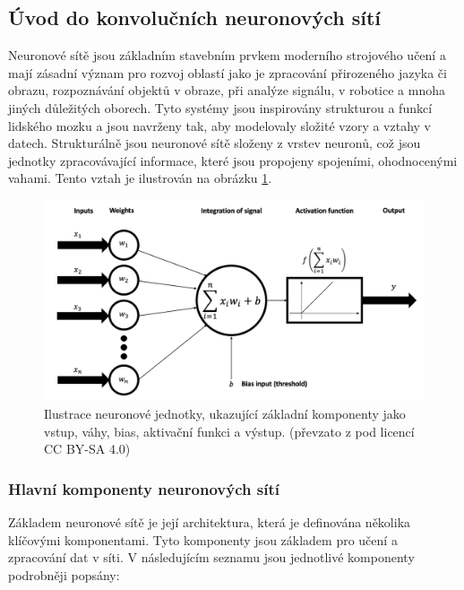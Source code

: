 \documentclass[male,czech,api_ing]{thesis}
\begin{document}
\subsection{Úvod do konvolučních neuronových sítí}
Neuronové sítě jsou základním stavebním prvkem moderního strojového učení a mají zásadní význam pro rozvoj oblastí jako je zpracování přirozeného jazyka či obrazu, rozpoznávání objektů v obraze, při analýze signálu, v robotice a mnoha jiných důležitých oborech. Tyto systémy jsou inspirovány strukturou a funkcí lidského mozku a jsou navrženy tak, aby modelovaly složité vzory a vztahy v datech. Strukturálně jsou neuronové sítě složeny z vrstev neuronů, což jsou jednotky zpracovávající informace, které jsou propojeny spojeními, ohodnocenými vahami. Tento vztah je ilustrován na obrázku \ref{fig:nn_components}.

\begin{figure}[H]
    \centering
    \includegraphics[width=\linewidth]{Prilohy/Obrazky/NNComponents.png}
    \caption{Ilustrace neuronové jednotky, ukazující základní komponenty jako vstup, váhy, bias, aktivační funkci a výstup. (převzato z \cite{NNComponentsIMG} pod licencí CC BY-SA 4.0)}
    \label{fig:nn_components}
\end{figure}

\subsubsection{Hlavní komponenty neuronových sítí}
Základem neuronové sítě je její architektura, která je definována několika klíčovými komponentami. Tyto komponenty jsou základem pro učení a zpracování dat v síti. V následujícím seznamu jsou jednotlivé komponenty podrobněji popsány:
\end{document}
